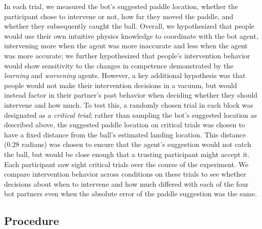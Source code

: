 \documentclass[10pt,letterpaper]{article}
\begin{document}
In each trial, we measured the bot's suggested paddle location, whether the participant chose to intervene or not, how far they moved the paddle, and whether they subsequently caught the ball. Overall, we hypothesized that people would use their own intuitive physics knowledge to coordinate with the bot agent, intervening more when the agent was more inaccurate and less when the agent was more accurate; we further hypothesized that people's intervention behavior would show sensitivity to the changes in competence demonstrated by the \textit{learning} and \textit{worsening} agents. However, a key additional hypothesis was that people would not make their intervention decisions in a vacuum, but would instead factor in their partner's past behavior when deciding whether they should intervene and how much. To test this, a randomly chosen trial in each block was designated as a \textit{critical trial}; rather than sampling the bot's suggested location as described above, the suggested paddle location on critical trials was chosen to have a fixed distance from the ball's estimated landing location. This distance (0.28 radians) was chosen to ensure that the agent's suggestion would not catch the ball, but would be close enough that a trusting participant might accept it. Each participant saw eight critical trials over the course of the experiment. We compare intervention behavior across conditions on these trials to see whether decisions about when to intervene and how much differed with each of the four bot partners even when the absolute error of the paddle suggestion was the same. 


\subsection{Procedure}
\end{document}
